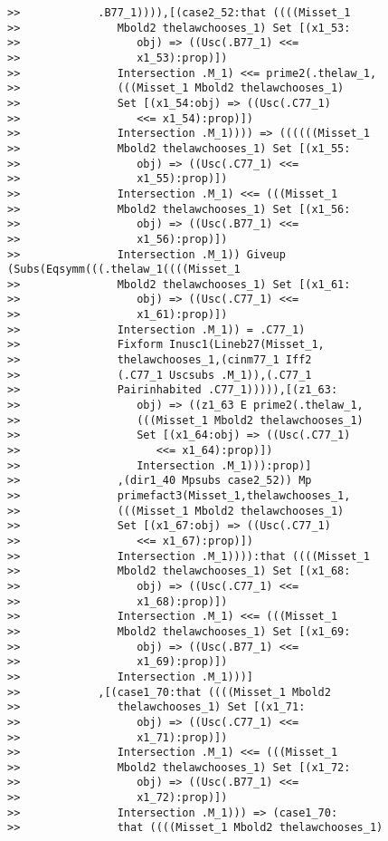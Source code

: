 \documentclass[12pt]{article}
\begin{document}
\begin{verbatim}
>>            .B77_1)))),[(case2_52:that ((((Misset_1
>>               Mbold2 thelawchooses_1) Set [(x1_53:
>>                  obj) => ((Usc(.B77_1) <<=
>>                  x1_53):prop)])
>>               Intersection .M_1) <<= prime2(.thelaw_1,
>>               (((Misset_1 Mbold2 thelawchooses_1)
>>               Set [(x1_54:obj) => ((Usc(.C77_1)
>>                  <<= x1_54):prop)])
>>               Intersection .M_1)))) => ((((((Misset_1
>>               Mbold2 thelawchooses_1) Set [(x1_55:
>>                  obj) => ((Usc(.C77_1) <<=
>>                  x1_55):prop)])
>>               Intersection .M_1) <<= (((Misset_1
>>               Mbold2 thelawchooses_1) Set [(x1_56:
>>                  obj) => ((Usc(.B77_1) <<=
>>                  x1_56):prop)])
>>               Intersection .M_1)) Giveup (Subs(Eqsymm(((.thelaw_1((((Misset_1
>>               Mbold2 thelawchooses_1) Set [(x1_61:
>>                  obj) => ((Usc(.C77_1) <<=
>>                  x1_61):prop)])
>>               Intersection .M_1)) = .C77_1)
>>               Fixform Inusc1(Lineb27(Misset_1,
>>               thelawchooses_1,(cinm77_1 Iff2
>>               (.C77_1 Uscsubs .M_1)),(.C77_1
>>               Pairinhabited .C77_1))))),[(z1_63:
>>                  obj) => ((z1_63 E prime2(.thelaw_1,
>>                  (((Misset_1 Mbold2 thelawchooses_1)
>>                  Set [(x1_64:obj) => ((Usc(.C77_1)
>>                     <<= x1_64):prop)])
>>                  Intersection .M_1))):prop)]
>>               ,(dir1_40 Mpsubs case2_52)) Mp
>>               primefact3(Misset_1,thelawchooses_1,
>>               (((Misset_1 Mbold2 thelawchooses_1)
>>               Set [(x1_67:obj) => ((Usc(.C77_1)
>>                  <<= x1_67):prop)])
>>               Intersection .M_1)))):that ((((Misset_1
>>               Mbold2 thelawchooses_1) Set [(x1_68:
>>                  obj) => ((Usc(.C77_1) <<=
>>                  x1_68):prop)])
>>               Intersection .M_1) <<= (((Misset_1
>>               Mbold2 thelawchooses_1) Set [(x1_69:
>>                  obj) => ((Usc(.B77_1) <<=
>>                  x1_69):prop)])
>>               Intersection .M_1)))]
>>            ,[(case1_70:that ((((Misset_1 Mbold2
>>               thelawchooses_1) Set [(x1_71:
>>                  obj) => ((Usc(.C77_1) <<=
>>                  x1_71):prop)])
>>               Intersection .M_1) <<= (((Misset_1
>>               Mbold2 thelawchooses_1) Set [(x1_72:
>>                  obj) => ((Usc(.B77_1) <<=
>>                  x1_72):prop)])
>>               Intersection .M_1))) => (case1_70:
>>               that ((((Misset_1 Mbold2 thelawchooses_1)

\end{verbatim}
\end{document}
